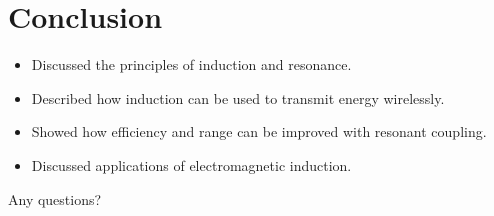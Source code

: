 \documentclass{beamer}
\begin{document}
\section{Conclusion}
\begin{frame}
	\begin{itemize}
		\item Discussed the principles of induction and resonance.
		\item Described how induction can be used to transmit energy wirelessly.
		\item Showed how efficiency and range can be improved with resonant coupling.
		\item Discussed applications of electromagnetic induction.
	\end{itemize}
\end{frame}

\begin{frame}
  \center Any questions?
\end{frame}
\end{document}
